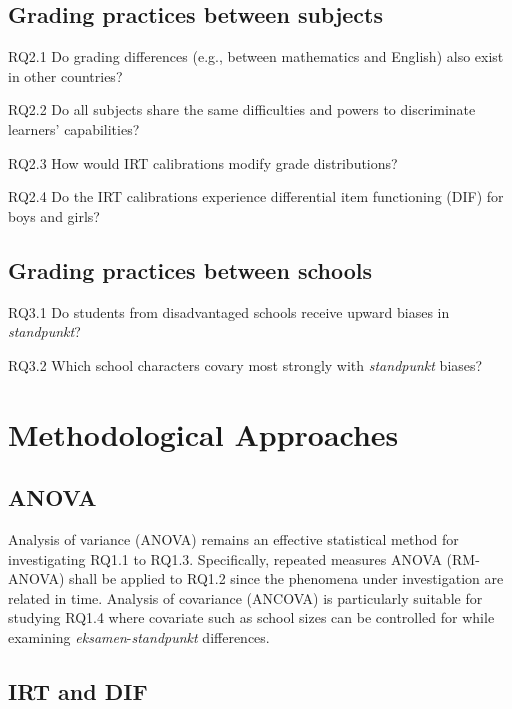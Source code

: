 \documentclass[
    a4paper,            %
    12pt,               %
    stu,                %
    donotrepeattitle,   %
    noextraspace,       %
    floatsintext,       %
    biblatex,           %
    colorlinks=true,        %
    linkcolor=red,          %
    anchorcolor=black,      %
    citecolor=blue,         %
    urlcolor=blue,          %
    bookmarks=true,         %
    bookmarksopen=false,    %
    bookmarksnumbered=true  %
]{apa7}
\begin{document}
\subsection{Grading practices between subjects}
\begin{APAenumerate}
    \item[RQ2.1] Do grading differences (e.g., between mathematics and English) also exist in other countries?
    \item[RQ2.2] Do all subjects share the same difficulties and powers to discriminate learners' capabilities?
    \item[RQ2.3] How would IRT calibrations modify grade distributions?
    \item[RQ2.4] Do the IRT calibrations experience differential item functioning (DIF) for boys and girls?
\end{APAenumerate}

\subsection{Grading practices between schools}
\begin{APAenumerate}
    \item[RQ3.1] Do students from disadvantaged schools receive upward biases in \textit{standpunkt}?
    \item[RQ3.2] Which school characters covary most strongly with \textit{standpunkt} biases?
\end{APAenumerate}

\section{Methodological Approaches}

\subsection{ANOVA}

Analysis of variance (ANOVA) remains an effective statistical method for investigating RQ1.1 to RQ1.3. Specifically, repeated measures ANOVA (RM-ANOVA) shall be applied to RQ1.2 since the phenomena under investigation are related in time. Analysis of covariance (ANCOVA) is particularly suitable for studying RQ1.4 where covariate such as school sizes can be controlled for while examining \textit{eksamen}-\textit{standpunkt} differences.

\subsection{IRT and DIF}
\end{document}
